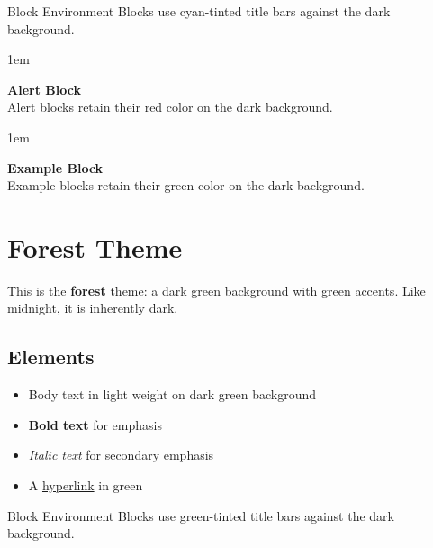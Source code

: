 \documentclass[
    language=english,
    doctype=article,
    institution=none,
    titlestyle=simple,
]{../../omnilatex}
\begin{document}
\begin{block}{Block Environment}
    Blocks use cyan-tinted title bars against the dark background.
\end{block}

\begin{addmargin}{1em}
\colorbox{red!10}{\parbox{0.95\linewidth}{\textbf{Alert Block}\\Alert blocks retain their red color on the dark background.}}
\end{addmargin}

\begin{addmargin}{1em}
\colorbox{green!10}{\parbox{0.95\linewidth}{\textbf{Example Block}\\Example blocks retain their green color on the dark background.}}
\end{addmargin}

\newpage


\section{Forest Theme}


This is the \textbf{forest} theme: a dark green background with green accents.
Like midnight, it is inherently dark.

\subsection{Elements}

\begin{itemize}
    \item Body text in light weight on dark green background
    \item \textbf{Bold text} for emphasis
    \item \textit{Italic text} for secondary emphasis
    \item A \href{https://github.com/WyattAu/OmniLaTeX-template}{hyperlink} in green
\end{itemize}

\begin{block}{Block Environment}
    Blocks use green-tinted title bars against the dark background.
\end{block}

\newpage

\end{document}
